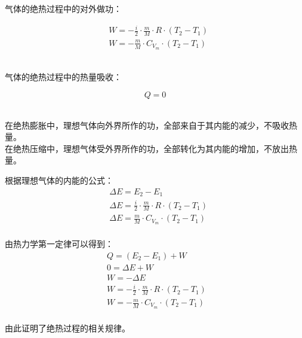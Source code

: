 \documentclass[UTF8]{ctexart}
\begin{document}
    气体的绝热过程中的对外做功：
    \begin{large}
        \begin{align*}
            &W=-\frac{i}{2}\cdot\frac{m}{M}\cdot R\cdot(T_2-T_1)\\[3mm]
            &W=-\frac{m}{M}\cdot C_{V_m}\cdot(T_2-T_1)
        \end{align*}
    \end{large}\\
    气体的绝热过程中的热量吸收：
    \begin{large}
        \begin{equation*}
            Q=0
        \end{equation*}
    \end{large}\\
    在绝热膨胀中，理想气体向外界所作的功，全部来自于其内能的减少，不吸收热量。\\[3mm]
    在绝热压缩中，理想气体受外界所作的功，全部转化为其内能的增加，不放出热量。\\[3mm]

\newpage

    根据理想气体的内能的公式：
    \begin{align}
        &\Delta E=E_2-E_1\\[3mm]
        &\Delta E=\frac{i}{2}\cdot\frac{m}{M}\cdot R\cdot (T_2-T_1)\\[3mm]
        &\Delta E=\frac{m}{M}\cdot C_{V_m}\cdot(T_2-T_1)
    \end{align}\\
    由热力学第一定律可以得到：
    \begin{align}
        &Q=(E_2-E_1)+W\\[3mm]
        &0=\Delta E+W\\[3mm]
        &W=-\Delta E\\[3mm]
        &W=-\frac{i}{2}\cdot\frac{m}{M}\cdot R\cdot (T_2-T_1)~~\\[3mm]
        &W=-\frac{m}{M}\cdot C_{V_m}\cdot(T_2-T_1)
    \end{align}\\
    由此证明了绝热过程的相关规律。
\end{document}
